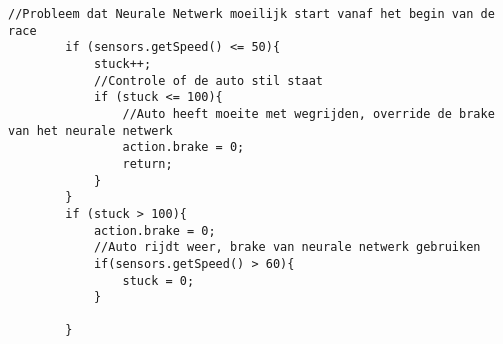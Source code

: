 \begin{lstlisting}
//Probleem dat Neurale Netwerk moeilijk start vanaf het begin van de race
        if (sensors.getSpeed() <= 50){
            stuck++;
            //Controle of de auto stil staat
            if (stuck <= 100){
                //Auto heeft moeite met wegrijden, override de brake van het neurale netwerk
                action.brake = 0;
                return;
            }
        }
        if (stuck > 100){
            action.brake = 0;
            //Auto rijdt weer, brake van neurale netwerk gebruiken
            if(sensors.getSpeed() > 60){
                stuck = 0;
            }

        }

\end{lstlisting}